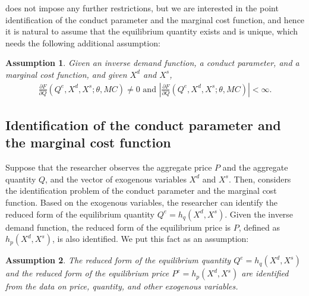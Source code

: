 \documentclass[11pt, a4paper]{article}
\newtheorem{assumption}{Assumption}
\theoremstyle{remark}
\begin{document}
\citet{lau1982identifying} does not impose any further restrictions, but we are interested in the point identification of the conduct parameter and the marginal cost function, and hence it is natural to assume that the equilibrium quantity exists and is unique, which needs the following additional assumption:
\begin{assumption}\label{assumption:unique_equilibrium}
    Given an inverse demand function, a conduct parameter, and a marginal cost function, and given $X^{d}$ and $X^{s}$,
    \begin{align}
        \frac{\partial F}{\partial Q}(Q^{e}, X^{d}, X^{s}; \theta, MC) \ne 0 \text{ and } \left| \frac{\partial F}{\partial Q}(Q^{e}, X^{d}, X^{s}; \theta, MC)\right| < \infty. 
    \end{align}
\end{assumption}




\subsection{Identification of the conduct parameter and the marginal cost function}\label{sec:definition_identification}

Suppose that the researcher observes the aggregate price $P$ and the aggregate quantity $Q$, and the vector of exogenous variables $X^{d}$ and $X^{s}$.
Then, \citet{lau1982identifying} considers the identification problem of the conduct parameter and the marginal cost function.
Based on the exogenous variables, the researcher can identify the reduced form of the equilibrium quantity $Q^e = h_q(X^{d}, X^{s})$.
Given the inverse demand function, the reduced form of the equilibrium price is $P$, defined as $h_p(X^{d}, X^{s})$, is also identified.
We put this fact as an assumption:
\begin{assumption}\label{assumption:reduced_form_identification}
    The reduced form of the equilibrium quantity $Q^e = h_q(X^{d}, X^{s})$ and the reduced form of the equilibrium price $P^e = h_p(X^{d}, X^{s})$ are identified from the data on price, quantity, and other exogenous variables.
\end{assumption}
\end{document}
